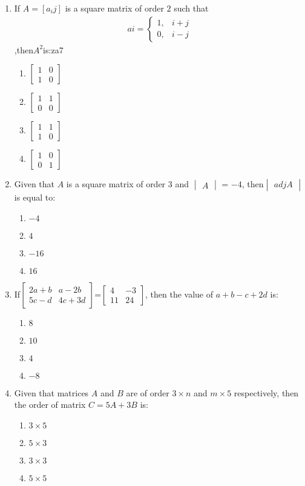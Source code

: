 \documentclass{article}
\newcommand{\myvec}[1]{\begin{bmatrix}#1\end{bmatrix}}
\newcommand{\mydet}[1]{\begin{vmatrix}#1\end{vmatrix}}
\begin{document}
\begin{enumerate}
    \item If $A = [a_{i}{j}]$ is a square matrix of order $2$ such that 
	    \begin{align*}
		    a{i}=\begin{cases}
			    1, &  i + j \\
			    0, &  i - j
		    \end{cases}
	    \end{align*},then$A^2$is:za7

    \begin{enumerate}
        \item $\myvec{1&0\\1 &0}$
        \item $ \myvec{1&1\\0&0}$
        \item $\myvec{1&1\\1&0}$
        \item $\myvec{1&0\\0&1}$
    \end{enumerate}

    \item Given that $A$ is a square matrix of order $3$ and $\mydet{A}$ = $-4$, then$\mydet{adjA}$ is equal to:
    \begin{enumerate}
        \item $-4$
        \item $4$
        \item $-16$
        \item $16$
    \end{enumerate}
    
    \item If$\myvec{2a+b & a-2b \\5c-d & 4c+3d}$=$\myvec{4&-3 \\11&24}$,
    then the value of $a + b - c + 2d$ is:
    \begin{enumerate}
        \item  $8$
        \item $10$
        \item $4$ 
        \item $-8$
    \end{enumerate}

  \item Given that matrices $A$ and $B$ are of order $3 \times n$ and $m \times 5$ respectively, then the order of matrix $C = 5A + 3B$ is:
    \begin{enumerate}
        \item $ 3 \times 5$ 
        \item $ 5 \times 3$ 
        \item $ 3 \times 3$ 
        \item $ 5 \times 5$
    \end{enumerate}


\end{enumerate}
\end{document}
